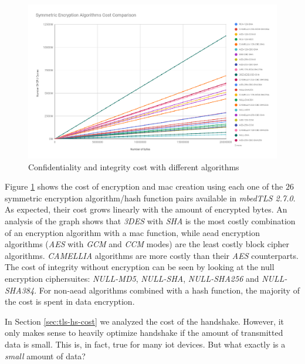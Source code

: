 \documentclass{llncs}
\begin{document}
\begin{figure}
  \centering
  \includegraphics[width=1.0\textwidth]{img/sym_algs_cc.png}
  \centering \caption{\label{fig:symm-encr-all} Confidentiality and integrity cost with different algorithms}
\end{figure}

Figure \ref{fig:symm-encr-all} shows the cost of encryption and \gls{mac} creation using each one of the $26$ symmetric encryption 
algorithm/hash function pairs available in \textit{mbedTLS 2.7.0}. As expected, their cost grows linearly with the amount of encrypted bytes.
An analysis of the graph shows that \textit{3DES} with \textit{SHA} is the most costly combination of an encryption algorithm with a \gls{mac} function, 
while \gls{aead} encryption algorithms 
(\textit{AES} with \textit{GCM} and \textit{CCM} modes) are the least costly block cipher algorithms. 
\textit{CAMELLIA} algorithms are more costly than their \textit{AES} counterparts.  The cost of integrity without encryption can be seen by looking at the null
encryption ciphersuites: \textit{NULL-MD5}, \textit{NULL-SHA}, \textit{NULL-SHA256} and \textit{NULL-SHA384}.
For non-\gls{aead} algorithms combined with a hash function, the majority of the cost is spent in data encryption.

In Section \ref{sec:tls-hs-cost} we analyzed the cost of the handshake. However, it only makes sense to heavily optimize handshake
if the amount of transmitted data is small. This is, in fact, true for many \gls{iot} devices. But what exactly is a \textit{small} amount of data?
\end{document}
